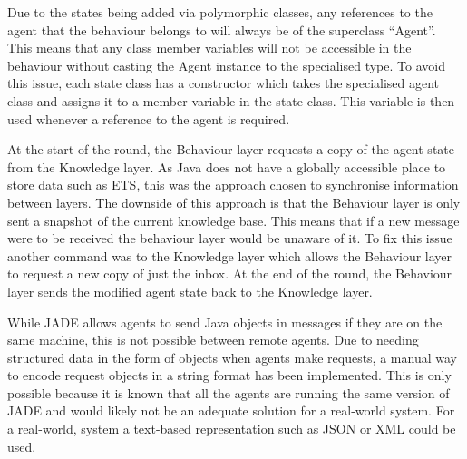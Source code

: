 Due to the states being added via polymorphic classes, any references to the agent that the behaviour belongs to will always be of the superclass ``Agent''.
This means that any class member variables will not be accessible in the behaviour without casting the Agent instance to the specialised type.
To avoid this issue, each state class has a constructor which takes the specialised agent class and assigns it to a member variable in the state class.
This variable is then used whenever a reference to the agent is required.

At the start of the round, the Behaviour layer requests a copy of the agent state from the Knowledge layer.
As Java does not have a globally accessible place to store data such as ETS, this was the approach chosen to synchronise information between layers.
The downside of this approach is that the Behaviour layer is only sent a snapshot of the current knowledge base.
This means that if a new message were to be received the behaviour layer would be unaware of it.
To fix this issue another command was to the Knowledge layer which allows the Behaviour layer to request a new copy of just the inbox.
At the end of the round, the Behaviour layer sends the modified agent state back to the Knowledge layer.

While JADE allows agents to send Java objects in messages if they are on the same machine, this is not possible between remote agents.
Due to needing structured data in the form of objects when agents make requests, a manual way to encode request objects in a string format has been implemented.
This is only possible because it is known that all the agents are running the same version of JADE and would likely not be an adequate solution for a real-world system.
For a real-world, system a text-based representation such as JSON or XML could be used.

